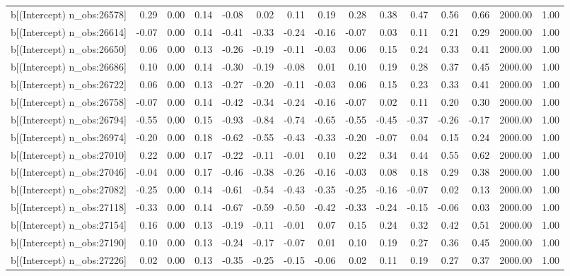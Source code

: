 \begin{table}[ht]
\begin{tabular}{rrrrrrrrrrrrrrr}
  b[(Intercept) n\_obs:26578] & 0.29 & 0.00 & 0.14 & -0.08 & 0.02 & 0.11 & 0.19 & 0.28 & 0.38 & 0.47 & 0.56 & 0.66 & 2000.00 & 1.00 \\ 
  b[(Intercept) n\_obs:26614] & -0.07 & 0.00 & 0.14 & -0.41 & -0.33 & -0.24 & -0.16 & -0.07 & 0.03 & 0.11 & 0.21 & 0.29 & 2000.00 & 1.00 \\ 
  b[(Intercept) n\_obs:26650] & 0.06 & 0.00 & 0.13 & -0.26 & -0.19 & -0.11 & -0.03 & 0.06 & 0.15 & 0.24 & 0.33 & 0.41 & 2000.00 & 1.00 \\ 
  b[(Intercept) n\_obs:26686] & 0.10 & 0.00 & 0.14 & -0.30 & -0.19 & -0.08 & 0.01 & 0.10 & 0.19 & 0.28 & 0.37 & 0.45 & 2000.00 & 1.00 \\ 
  b[(Intercept) n\_obs:26722] & 0.06 & 0.00 & 0.13 & -0.27 & -0.20 & -0.11 & -0.03 & 0.06 & 0.15 & 0.23 & 0.33 & 0.41 & 2000.00 & 1.00 \\ 
  b[(Intercept) n\_obs:26758] & -0.07 & 0.00 & 0.14 & -0.42 & -0.34 & -0.24 & -0.16 & -0.07 & 0.02 & 0.11 & 0.20 & 0.30 & 2000.00 & 1.00 \\ 
  b[(Intercept) n\_obs:26794] & -0.55 & 0.00 & 0.15 & -0.93 & -0.84 & -0.74 & -0.65 & -0.55 & -0.45 & -0.37 & -0.26 & -0.17 & 2000.00 & 1.00 \\ 
  b[(Intercept) n\_obs:26974] & -0.20 & 0.00 & 0.18 & -0.62 & -0.55 & -0.43 & -0.33 & -0.20 & -0.07 & 0.04 & 0.15 & 0.24 & 2000.00 & 1.00 \\ 
  b[(Intercept) n\_obs:27010] & 0.22 & 0.00 & 0.17 & -0.22 & -0.11 & -0.01 & 0.10 & 0.22 & 0.34 & 0.44 & 0.55 & 0.62 & 2000.00 & 1.00 \\ 
  b[(Intercept) n\_obs:27046] & -0.04 & 0.00 & 0.17 & -0.46 & -0.38 & -0.26 & -0.16 & -0.03 & 0.08 & 0.18 & 0.29 & 0.38 & 2000.00 & 1.00 \\ 
  b[(Intercept) n\_obs:27082] & -0.25 & 0.00 & 0.14 & -0.61 & -0.54 & -0.43 & -0.35 & -0.25 & -0.16 & -0.07 & 0.02 & 0.13 & 2000.00 & 1.00 \\ 
  b[(Intercept) n\_obs:27118] & -0.33 & 0.00 & 0.14 & -0.67 & -0.59 & -0.50 & -0.42 & -0.33 & -0.24 & -0.15 & -0.06 & 0.03 & 2000.00 & 1.00 \\ 
  b[(Intercept) n\_obs:27154] & 0.16 & 0.00 & 0.13 & -0.19 & -0.11 & -0.01 & 0.07 & 0.15 & 0.24 & 0.32 & 0.42 & 0.51 & 2000.00 & 1.00 \\ 
  b[(Intercept) n\_obs:27190] & 0.10 & 0.00 & 0.13 & -0.24 & -0.17 & -0.07 & 0.01 & 0.10 & 0.19 & 0.27 & 0.36 & 0.45 & 2000.00 & 1.00 \\ 
  b[(Intercept) n\_obs:27226] & 0.02 & 0.00 & 0.13 & -0.35 & -0.25 & -0.15 & -0.06 & 0.02 & 0.11 & 0.19 & 0.27 & 0.37 & 2000.00 & 1.00 \\ 

\end{tabular}
\end{table}
